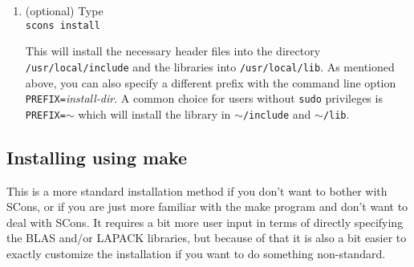 \documentclass[twoside,letterpaper,11pt]{article}
\begin{document}
\begin{enumerate}
\item (optional) Type\\
\texttt{scons install}

This will install the necessary header files into the directory \texttt{/usr/local/include} and the libraries
into \texttt{/usr/local/lib}.  As mentioned above, you can also specify a different prefix 
with the command line option \texttt{PREFIX=}\emph{install-dir}.  A common choice for users
without \texttt{sudo} privileges is \texttt{PREFIX=$\sim$} which will install the library in \texttt{$\sim$/include}
and \texttt{$\sim$/lib}.

\end{enumerate}

\subsection{Installing using make}
\label{Install_Make}
This is a more standard installation method if you don't want to bother with SCons, or if you are just
more familiar with the make program and don't want to deal with SCons.  It requires a bit more
user input in terms of directly specifying the BLAS and/or LAPACK libraries, but because of that
it is also a bit easier to exactly customize the installation if you want to do something non-standard.
\end{document}
